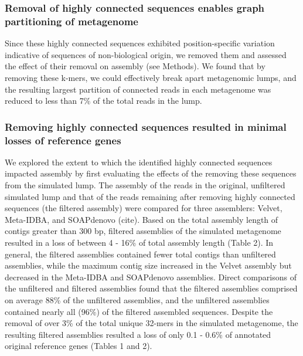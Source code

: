 \documentclass[10pt]{article}
\begin{document}
\subsubsection*{Removal of highly connected sequences enables graph partitioning of metagenome}

Since these highly connected sequences exhibited position-specific
variation indicative of sequences of non-biological origin, we removed
them and assessed the effect of their removal on assembly
(see Methods).  We
found that by removing these k-mers, we could effectively break apart
metagenomic lumps, and the resulting largest partition of connected
reads in each metagenome was reduced to less than 7\% of the total
reads in the lump.
%

\subsubsection*{Removing highly connected sequences resulted in minimal losses of reference genes}

We explored the extent
to which the identified highly connected
sequences impacted assembly by first evaluating the effects of the
removing these sequences from the simulated lump.  The assembly of the reads in the original,
unfiltered simulated lump and that of the reads remaining after
removing highly connected sequences (the filtered assembly) were
compared for three assemblers: Velvet, Meta-IDBA, and SOAPdenovo (cite).
Based on the total assembly length of contigs greater than 300 bp,
filtered assemblies of the simulated metagenome resulted in a loss of
between 4 - 16\% of total assembly length (Table 2).  In general, the
filtered assemblies contained fewer total contigs than unfiltered
assemblies, while the maximum contig size increased in the Velvet
assembly but decreased in the Meta-IDBA and SOAPdenovo assemblies.
Direct comparisons of the unfiltered and filtered assemblies found
that the filtered assemblies comprised on average 88\% of the
unfiltered assemblies, and the unfiltered assemblies contained nearly
all (96\%) of the filtered assembled sequences.  Despite the removal
of over 3\% of the total unique 32-mers in the simulated metagenome,
the resulting filtered assemblies resulted a loss of only 0.1 -
0.6\% of annotated original reference genes (Tables 1 and 2).
\end{document}
